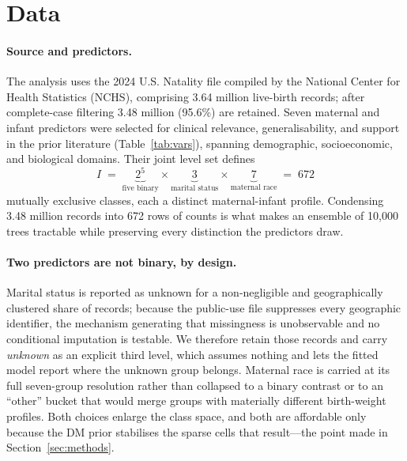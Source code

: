 \section{Data}
\label{sec:data}
\fontsize{12}{14}\selectfont

\paragraph{Source and predictors.}
The analysis uses the 2024 U.S. Natality file compiled by the National Center
for Health Statistics (NCHS), comprising 3.64 million live-birth records; after
complete-case filtering 3.48 million (95.6\%) are retained. Seven maternal and
infant predictors were selected for clinical relevance, generalisability, and
support in the prior literature (Table~\ref{tab:vars}), spanning demographic,
socioeconomic, and biological domains. Their joint level set defines
\[
  I \;=\; \underbrace{2^{5}}_{\text{five binary}}\times
          \underbrace{3}_{\text{marital status}}\times
          \underbrace{7}_{\text{maternal race}} \;=\; 672
\]
mutually exclusive classes, each a distinct maternal-infant profile. Condensing
3.48 million records into 672 rows of counts is what makes an ensemble of
10{,}000 trees tractable while preserving every distinction the predictors draw.

\paragraph{Two predictors are not binary, by design.}
Marital status is reported as unknown for a non-negligible and geographically
clustered share of records; because the public-use file suppresses every
geographic identifier, the mechanism generating that missingness is
unobservable and no conditional imputation is testable. We therefore retain
those records and carry \emph{unknown} as an explicit third level, which
assumes nothing and lets the fitted model report where the unknown group
belongs. Maternal race is carried at its full seven-group resolution rather
than collapsed to a binary contrast or to an ``other'' bucket that would merge
groups with materially different birth-weight profiles. Both choices enlarge
the class space, and both are affordable only because the DM prior stabilises
the sparse cells that result---the point made in Section~\ref{sec:methods}.

